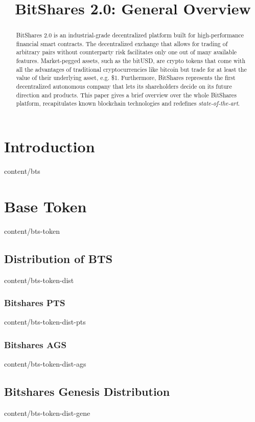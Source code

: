 \documentclass[unpublished]{btswhitepaper}
\title{BitShares 2.0: General Overview}
\begin{document}
\maketitle

\begin{abstract}%
 BitShares 2.0 is an industrial-grade decentralized platform built for
 high-performance financial smart contracts. The decentralized exchange that
 allows for trading of arbitrary pairs without counterparty risk facilitates
 only one out of many available features. Market-pegged assets, such as the
 bitUSD, are crypto tokens that come with all the advantages of traditional
 cryptocurrencies like bitcoin but trade for at least the value of their
 underlying asset, e.g. \$1. Furthermore, BitShares represents the first
 decentralized autonomous company that lets its shareholders decide on its
 future direction and products. This paper gives a brief overview over the
 whole BitShares platform, recapitulates known blockchain technologies and
 redefines \emph{state-of-the-art}.
\end{abstract}

\section       { Introduction                      }  { content/bts                 } 

\section       { Base Token                        }  { content/bts-token           } 
\subsection    { Distribution of BTS               }  { content/bts-token-dist      } 
\subsubsection { Bitshares PTS                     }  { content/bts-token-dist-pts  } 
\subsubsection { Bitshares AGS                     }  { content/bts-token-dist-ags  } 
\subsection    { Bitshares Genesis Distribution    }  { content/bts-token-dist-gene } 
\end{document}
